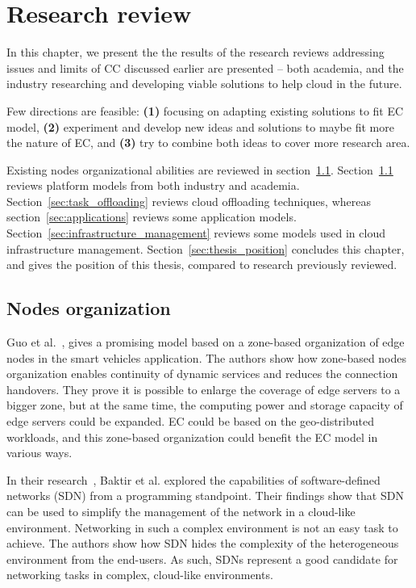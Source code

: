 \chapter{Research review}\label{chapter:Review}
%
In this chapter, we present the the results of the research reviews addressing issues and limits of CC discussed earlier are presented -- both academia, and the industry researching and developing viable solutions to help cloud in the future. 

Few directions are feasible: \textbf{(1)} focusing on adapting existing solutions to fit EC model, \textbf{(2)} experiment and develop new ideas and solutions to maybe fit more the nature of EC, and \textbf{(3)} try to combine both ideas to cover more research area.

Existing nodes organizational abilities are reviewed in section~\ref{sec:nodes_organization}. Section~\ref{sec:nodes_organization} reviews platform models from both industry and academia. Section~\ref{sec:task_offloading} reviews cloud offloading techniques, whereas section~\ref{sec:applications} reviews some application models. Section~\ref{sec:infrastructure_management} reviews some models used in cloud infrastructure management. Section~\ref{sec:thesis_position} concludes this chapter, and gives the position of this thesis, compared to research previously reviewed.
%
%
\section{Nodes organization}\label{sec:nodes_organization}
Guo et al.~\cite{GuoRG20}, gives a promising model based on a zone-based organization of edge nodes in the smart vehicles application. The authors show how zone-based nodes organization enables continuity of dynamic services and reduces the connection handovers. They prove it is possible to enlarge the coverage of edge servers to a bigger zone, but at the same time, the computing power and storage capacity of edge servers could be expanded. EC could be based on the geo-distributed workloads, and this zone-based organization could benefit the EC model in various ways. 

In their research~\cite{BaktirOE17}, Baktir et al. explored the capabilities of software-defined networks (SDN) from a programming standpoint. Their findings show that SDN can be used to simplify the management of the network in a cloud-like environment. Networking in such a complex environment is not an easy task to achieve. The authors show how SDN hides the complexity of the heterogeneous environment from the end-users. As such, SDNs represent a good candidate for networking tasks in complex, cloud-like environments. 


